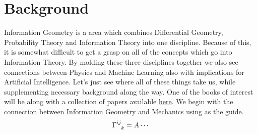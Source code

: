 \section{Background}

Information Geometry is a area which combines Differential Geometry,
Probability Theory and Information Theory into one discipline.  Because of
this, it is somewhat difficult to get a grasp on all of the concepts which go
into Information Theory.  By molding these three disciplines together we also
see connections between Physics and Machine Learning also with implications
for Artificial Intelligence.  Let's just see where all of these things take
us, while supplementing necessary background along the way.  One of the books
of interest will be \cite{dodson} along with a collection of papers available
\href{https://mega.nz/folder/5w0CDDzR\#EUMxMbyRJdNSKsqKIuEyFg}{here}.  We begin
with the connection between Information Geometry and Mechanics using
\cite{leok1} as the guide.  
\begin{equation*} 
    \tensor{\Gamma}{^{ij}_{k}} =A \cdots 
\end{equation*}

